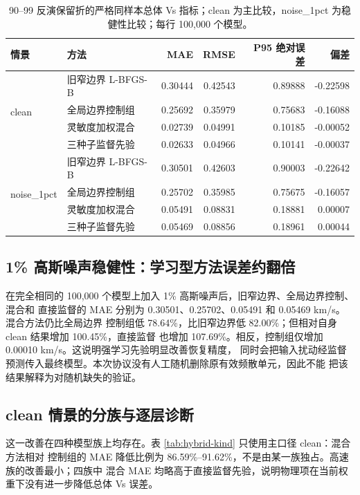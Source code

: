 \documentclass[UTF8,a4paper,11pt]{ctexart}
\begin{document}
\begin{table}[H]
\centering
\caption{90--99 反演保留折的严格同样本总体 Vs 指标；clean 为主比较，noise\_1pct 为稳健性比较；每行 100{,}000 个模型。}
\label{tab:hybrid-inversion-overall}
\small
\begin{tabular}{llrrrr}
\toprule
情景 & 方法 & MAE & RMSE & P95 绝对误差 & 偏差 \\
\midrule
\multirow{4}{*}{clean}
 & 旧窄边界 L-BFGS-B & 0.30444 & 0.42543 & 0.89888 & -0.22598 \\
 & 全局边界控制组 & 0.25692 & 0.35979 & 0.75683 & -0.16088 \\
 & 灵敏度加权混合 & 0.02739 & 0.04991 & 0.10185 & -0.00052 \\
 & 三种子监督先验 & 0.02633 & 0.04966 & 0.10141 & -0.00037 \\
\midrule
\multirow{4}{*}{noise\_1pct}
 & 旧窄边界 L-BFGS-B & 0.30501 & 0.42603 & 0.90003 & -0.22642 \\
 & 全局边界控制组 & 0.25702 & 0.35985 & 0.75675 & -0.16057 \\
 & 灵敏度加权混合 & 0.05491 & 0.08831 & 0.18881 & 0.00007 \\
 & 三种子监督先验 & 0.05469 & 0.08856 & 0.18961 & 0.00044 \\
\bottomrule
\end{tabular}
\end{table}

\subsection{1\% 高斯噪声稳健性：学习型方法误差约翻倍}

在完全相同的 100{,}000 个模型上加入 1\% 高斯噪声后，旧窄边界、全局边界控制、混合和
直接监督的 MAE 分别为 0.30501、0.25702、0.05491 和 0.05469 km/s。混合方法仍比全局边界
控制组低 78.64\%，比旧窄边界低 82.00\%；但相对自身 clean 结果增加 100.45\%，直接监督
也增加 107.69\%。相反，控制组仅增加 0.00010 km/s。这说明强学习先验明显改善恢复精度，
同时会把输入扰动经监督预测传入最终模型。本次协议没有人工随机删除原有效频散单元，因此不能
把该结果解释为对随机缺失的验证。

\subsection{clean 情景的分族与逐层诊断}

这一改善在四种模型族上均存在。表 \ref{tab:hybrid-kind} 只使用主口径 clean：混合方法相对
控制组的 MAE 降低比例为 86.59\%--91.62\%，不是由某一族独占。高速族的改善最小；四族中
混合 MAE 均略高于直接监督先验，说明物理项在当前权重下没有进一步降低总体 Vs 误差。
\end{document}
